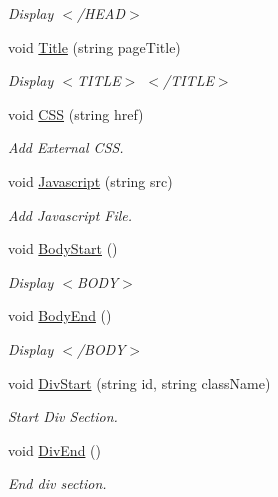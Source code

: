 \begin{DoxyCompactItemize}
\begin{DoxyCompactList}\small\item\em Display $<$/\-H\-E\-A\-D$>$ \end{DoxyCompactList}\item 
void \hyperlink{classHTMLTags_a5128d6f1c6be5ac1689047fc9d0d159f}{Title} (string page\-Title)
\begin{DoxyCompactList}\small\item\em Display $<$\-T\-I\-T\-L\-E$>$ $<$/\-T\-I\-T\-L\-E$>$ \end{DoxyCompactList}\item 
void \hyperlink{classHTMLTags_a4e9e18580cc7f2b82c82e4f81e39be50}{C\-S\-S} (string href)
\begin{DoxyCompactList}\small\item\em Add External C\-S\-S. \end{DoxyCompactList}\item 
void \hyperlink{classHTMLTags_aea041d720f12a210615c95350774e6aa}{Javascript} (string src)
\begin{DoxyCompactList}\small\item\em Add Javascript File. \end{DoxyCompactList}\item 
void \hyperlink{classHTMLTags_af1fb7b90b9ebb83177da18aba1ef86a9}{Body\-Start} ()
\begin{DoxyCompactList}\small\item\em Display $<$\-B\-O\-D\-Y$>$ \end{DoxyCompactList}\item 
void \hyperlink{classHTMLTags_a7cae36bd3a0e6f35e89494e5cda64971}{Body\-End} ()
\begin{DoxyCompactList}\small\item\em Display $<$/\-B\-O\-D\-Y$>$ \end{DoxyCompactList}\item 
void \hyperlink{classHTMLTags_a897512b202cfd12729e8fa24e67ea4d6}{Div\-Start} (string id, string class\-Name)
\begin{DoxyCompactList}\small\item\em Start Div Section. \end{DoxyCompactList}\item 
void \hyperlink{classHTMLTags_aa82b2d3d85b3afd29e5641dbe1ace439}{Div\-End} ()
\begin{DoxyCompactList}\small\item\em End div section. \end{DoxyCompactList}\item 

\end{DoxyCompactItemize}

